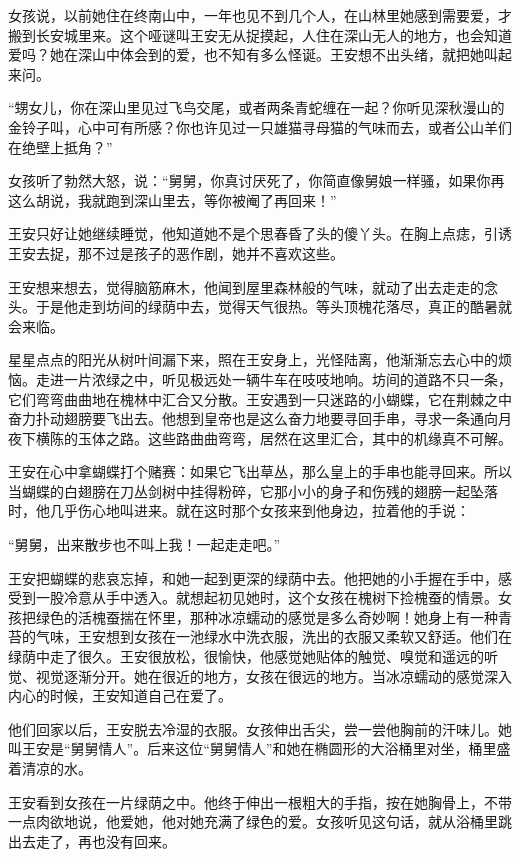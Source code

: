 女孩说，以前她住在终南山中，一年也见不到几个人，在山林里她感到需要爱，才搬到长安城里来。这个哑谜叫王安无从捉摸起，人住在深山无人的地方，也会知道爱吗？她在深山中体会到的爱，也不知有多么怪诞。王安想不出头绪，就把她叫起来问。 

“甥女儿，你在深山里见过飞鸟交尾，或者两条青蛇缠在一起？你听见深秋漫山的金铃子叫，心中可有所感？你也许见过一只雄猫寻母猫的气味而去，或者公山羊们在绝壁上抵角？” 

女孩听了勃然大怒，说：“舅舅，你真讨厌死了，你简直像舅娘一样骚，如果你再这么胡说，我就跑到深山里去，等你被阉了再回来！” 

王安只好让她继续睡觉，他知道她不是个思春昏了头的傻丫头。在胸上点痣，引诱王安去捉，那不过是孩子的恶作剧，她并不喜欢这些。 

王安想来想去，觉得脑筋麻木，他闻到屋里森林般的气味，就动了出去走走的念头。于是他走到坊间的绿荫中去，觉得天气很热。等头顶槐花落尽，真正的酷暑就会来临。 

星星点点的阳光从树叶间漏下来，照在王安身上，光怪陆离，他渐渐忘去心中的烦恼。走进一片浓绿之中，听见极远处一辆牛车在吱吱地响。坊间的道路不只一条，它们弯弯曲曲地在槐林中汇合又分散。王安遇到一只迷路的小蝴蝶，它在荆棘之中奋力扑动翅膀要飞出去。他想到皇帝也是这么奋力地要寻回手串，寻求一条通向月夜下横陈的玉体之路。这些路曲曲弯弯，居然在这里汇合，其中的机缘真不可解。 

王安在心中拿蝴蝶打个赌赛：如果它飞出草丛，那么皇上的手串也能寻回来。所以当蝴蝶的白翅膀在刀丛剑树中挂得粉碎，它那小小的身子和伤残的翅膀一起坠落时，他几乎伤心地叫进来。就在这时那个女孩来到他身边，拉着他的手说： 

“舅舅，出来散步也不叫上我！一起走走吧。” 

王安把蝴蝶的悲哀忘掉，和她一起到更深的绿荫中去。他把她的小手握在手中，感受到一股冷意从手中透入。就想起初见她时，这个女孩在槐树下捡槐蚕的情景。女孩把绿色的活槐蚕揣在怀里，那种冰凉蠕动的感觉是多么奇妙啊！她身上有一种青苔的气味，王安想到女孩在一池绿水中洗衣服，洗出的衣服又柔软又舒适。他们在绿荫中走了很久。王安很放松，很愉快，他感觉她贴体的触觉、嗅觉和遥远的听觉、视觉逐渐分开。她在很近的地方，女孩在很远的地方。当冰凉蠕动的感觉深入内心的时候，王安知道自己在爱了。 

他们回家以后，王安脱去冷湿的衣服。女孩伸出舌尖，尝一尝他胸前的汗味儿。她叫王安是“舅舅情人”。后来这位“舅舅情人”和她在椭圆形的大浴桶里对坐，桶里盛着清凉的水。 

王安看到女孩在一片绿荫之中。他终于伸出一根粗大的手指，按在她胸骨上，不带一点肉欲地说，他爱她，他对她充满了绿色的爱。女孩听见这句话，就从浴桶里跳出去走了，再也没有回来。 

